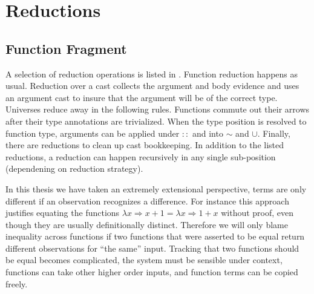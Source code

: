 \section{Reductions}
 
\subsection{Function Fragment}

A selection of reduction operations is listed in .
Function reduction happens as usual.
Reduction over a cast collects the argument and body evidence and uses an argument cast to insure that the argument will be of the correct type.
Universes reduce away in the following rules.
Functions commute out their arrows after their type annotations are trivialized.
When the type position is resolved to function type, arguments can be applied under $::$ and into $\sim$ and $\cup$.
Finally, there are reductions to clean up cast bookkeeping.
In addition to the listed reductions, a reduction can happen recursively in any single sub-position (dependening on reduction strategy).

In this thesis we have taken an extremely extensional perspective, terms are only different if an observation recognizes a difference.
For instance this approach justifies equating the functions $\lambda x\Rightarrow x+1=\lambda x\Rightarrow1+x$ without proof, even though they are usually definitionally distinct.
Therefore we will only blame inequality across functions if two functions that were asserted to be equal return different observations for ``the same'' input.
Tracking that two functions should be equal becomes complicated, the system must be sensible under context, functions can take other higher order inputs, and function terms can be copied freely.




